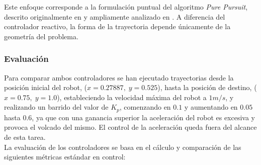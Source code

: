Este enfoque corresponde a la formulación puntual del algoritmo \textit{Pure Pursuit}, 
descrito originalmente en \cite{coulter1992} y ampliamente analizado en 
\cite{otero2005, morin2016, corke2017}. A diferencia del controlador reactivo, la forma de la 
trayectoria depende únicamente de la geometría del problema.

\subsubsection*{Evaluación}
Para comparar ambos controladores se han ejecutado trayectorias
desde la posición inicial del robot, ($x = 0.27887, \; y = 0.525$), 
hasta la posición de destino, ($x = 0.75, \; y = 1.0$), estableciendo
la velocidad máxima del robot a $1 m/s$, \cite{kheperaiv_manual_rev3} y realizando un 
barrido del valor de $K_p$, comenzando en $0.1$ y aumentando 
en $0.05$ hasta $0.6$, ya que con una ganancia superior la aceleración del robot 
es excesiva y provoca el volcado del mismo. El control de la aceleración queda 
fuera del alcance de esta tarea.\\ 

La evaluación de los controladores se basa en el cálculo y 
comparación de las siguientes métricas estándar en control:

